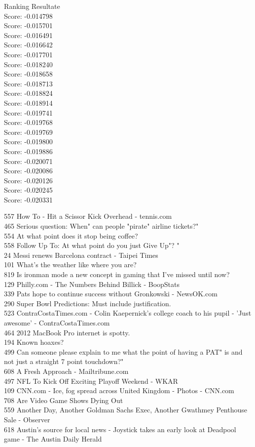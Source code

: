 \documentclass[11pt]{article}
\begin{document}
    Ranking Resultate\\
Score: -0.014798\\
Score: -0.015701\\
Score: -0.016491\\
Score: -0.016642\\
Score: -0.017701\\
Score: -0.018240\\
Score: -0.018658\\
Score: -0.018713\\
Score: -0.018824\\
Score: -0.018914\\
Score: -0.019741\\
Score: -0.019768\\
Score: -0.019769\\
Score: -0.019800\\
Score: -0.019886\\
Score: -0.020071\\
Score: -0.020086\\
Score: -0.020126\\
Score: -0.020245\\
Score: -0.020331

557 How To - Hit a Scissor Kick Overhead - tennis.com\\
465 Serious question: When" can people "pirate" airline tickets?"\\
554 At what point does it stop being coffee?\\
558 Follow Up To: At what point do you just Give Up"? "\\
24 Messi renews Barcelona contract - Taipei Times\\
101 What's the weather like where you are?\\
819 Is ironman mode a new concept in gaming that I've missed until
now?\\
129 Philly.com - The Numbers Behind Billick - BoopStats\\
339 Pats hope to continue success without Gronkowski - NewsOK.com\\
290 Super Bowl Predictions: Must include justification.\\
523 ContraCostaTimes.com - Colin Kaepernick's college coach to his pupil
- 'Just awesome' - ContraCostaTimes.com\\
464 2012 MacBook Pro internet is spotty.\\
194 Known hoaxes?\\
499 Can someone please explain to me what the point of having a PAT" is
and not just a straight 7 point touchdown?"\\
608 A Fresh Approach - Mailtribune.com\\
497 NFL To Kick Off Exciting Playoff Weekend - WKAR\\
109 CNN.com - Ice, fog spread across United Kingdom - Photos - CNN.com\\
708 Are Video Game Shows Dying Out\\
559 Another Day, Another Goldman Sachs Exec, Another Gwathmey Penthouse
Sale - Observer\\
618 Austin's source for local news - Joystick takes an early look at
Deadpool game - The Austin Daily Herald
\end{document}
